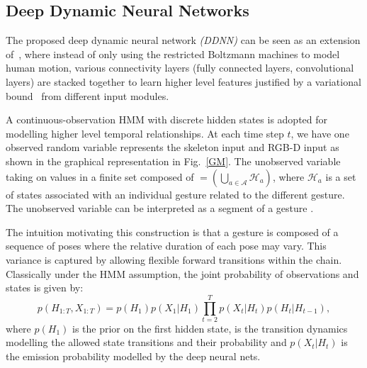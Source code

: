 \subsection{Deep Dynamic Neural Networks}
\label{sec:DDNN}

The proposed deep dynamic neural network \emph{(DDNN)} can be seen as an extension of~\cite{diwucvpr14}, where instead of only using the restricted Boltzmann machines to model human motion, various connectivity layers (fully connected layers, convolutional layers) are stacked together to learn higher level features justified by a variational bound~\cite{hinton2006fast} from different input modules.

A continuous-observation HMM with discrete hidden states is adopted for modelling higher level temporal relationships. At each time step $t$, we have one observed random variable \randomvariable{} represents the skeleton input \randomvariableSK{} and RGB-D input \randomvariableRGBD{} as shown in the graphical representation in Fig.~\ref{GM}.
 The unobserved variable \hiddenvariable{} taking on values in a finite set composed of \finiteset{}$=(\bigcup _{a \in \mathcal{A}} \mathcal{H}_a)$, where $\mathcal{H}_a$ is a set of states associated with an individual gesture \gesturea{} related to the different gesture. The unobserved variable \hiddenvariable{} can be interpreted as a segment of a gesture \gesturea{}.

 The intuition motivating this construction is that a gesture is composed of a sequence of poses where the relative duration of each pose may vary. This variance is captured by allowing flexible forward transitions within the chain.
 Classically under the HMM assumption, the joint probability of observations and states is given by:
\begin{equation}
p(H_{1:T},X_{1:T}) = p(H_1)p(X_1 | H_1) \prod^{T}_{t=2} p(X_t | H_t ) p(H_t | H_{t-1}),
\label{HMM_GM_1}
\end{equation}
where $p(H_1)$ is the prior on the first hidden state, \transitionmatrix{} is the transition dynamics modelling the allowed state transitions and their probability and $p(X_t | H_t )$ is the emission probability modelled by the deep neural nets.


